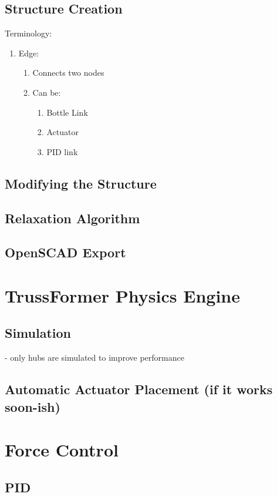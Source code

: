 \subsection{Structure Creation}
Terminology:\\
\begin{enumerate}
    \item Edge:
    \begin{enumerate}
        \item Connects two nodes
        \item Can be:
        \begin{enumerate}
            \item Bottle Link
            \item Actuator
            \item PID link
        \end{enumerate}
    \end{enumerate}
\end{enumerate}

\subsection{Modifying the Structure}

\subsection{Relaxation Algorithm}\label{relaxation}

\subsection{OpenSCAD Export}\label{sec:openscad_impl}

\section{TrussFormer Physics Engine}

\subsection{Simulation}
- only hubs are simulated to improve performance

\subsection{Automatic Actuator Placement (if it works soon-ish)}

\section{Force Control}

\subsection{PID}
